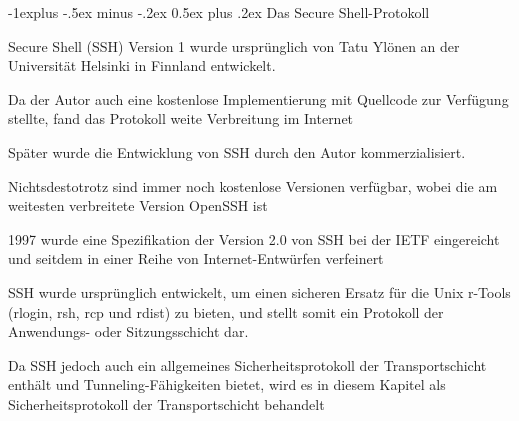 \documentclass[a4paper]{article}
\makeatletter
\renewcommand{\subsection}{\@startsection{subsection}{2}{0mm}%
 {-1explus -.5ex minus -.2ex}%
 {0.5ex plus .2ex}%
 {\normalfont\normalsize\bfseries}}
\makeatother
\begin{document}
\begin{multicols}{3}
\begin{itemize*}
            \subsection{Das Secure
                  Shell-Protokoll}
            \begin{itemize*}
                  \item       Secure Shell (SSH) Version 1 wurde ursprünglich von Tatu Ylönen an der
                  Universität Helsinki in Finnland entwickelt.
                  \item       Da der Autor auch eine kostenlose Implementierung mit Quellcode zur
                  Verfügung stellte, fand das Protokoll weite Verbreitung im Internet
                  \item       Später wurde die Entwicklung von SSH durch den Autor kommerzialisiert.
                  \item       Nichtsdestotrotz sind immer noch kostenlose Versionen verfügbar, wobei
                  die am weitesten verbreitete Version OpenSSH ist
                  \item       1997 wurde eine Spezifikation der Version 2.0 von SSH bei der IETF
                  eingereicht und seitdem in einer Reihe von Internet-Entwürfen
                  verfeinert
                  \item       SSH wurde ursprünglich entwickelt, um einen sicheren Ersatz für die
                  Unix r-Tools (rlogin, rsh, rcp und rdist) zu bieten, und stellt somit
                  ein Protokoll der Anwendungs- oder Sitzungsschicht dar.
                  \item       Da SSH jedoch auch ein allgemeines Sicherheitsprotokoll der
                  Transportschicht enthält und Tunneling-Fähigkeiten bietet, wird es in
                  diesem Kapitel als Sicherheitsprotokoll der Transportschicht behandelt
            \end{itemize*}


\end{itemize*}
\end{multicols}
\end{document}
